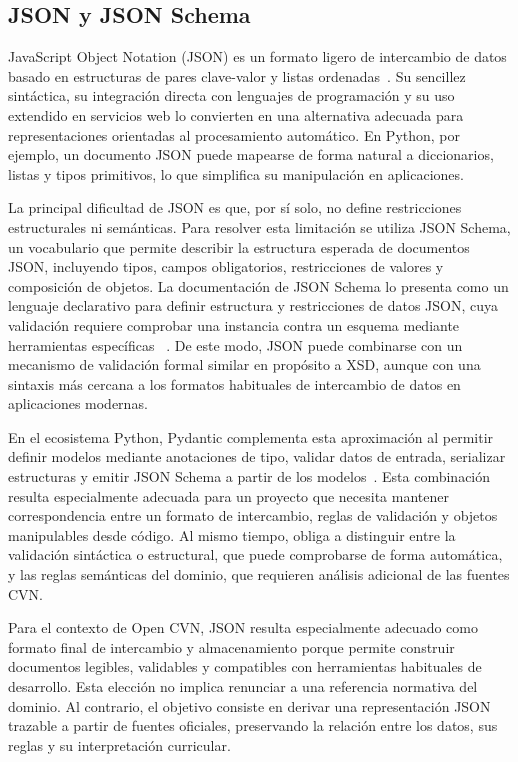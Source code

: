 \subsection{JSON y JSON Schema}
\label{subsec:estado_arte_json_schema}

JavaScript Object Notation (JSON) es un formato ligero de intercambio de datos
basado en estructuras de pares clave-valor y listas ordenadas~\cite{json_org_es}.
Su sencillez sintáctica, su integración directa con lenguajes de programación y
su uso extendido en servicios web lo convierten en una alternativa adecuada para
representaciones orientadas al procesamiento automático. En Python, por ejemplo,
un documento JSON puede mapearse de forma natural a diccionarios, listas y tipos
primitivos, lo que simplifica su manipulación en aplicaciones.

La principal dificultad de JSON es que, por sí solo, no define restricciones
estructurales ni semánticas. Para resolver esta limitación se utiliza JSON Schema,
un vocabulario que permite describir la estructura esperada de documentos JSON,
incluyendo tipos, campos obligatorios, restricciones de valores y composición de
objetos. La documentación de JSON Schema lo presenta como un lenguaje declarativo
para definir estructura y restricciones de datos JSON, cuya validación requiere
comprobar una instancia contra un esquema mediante herramientas específicas
~\cite{json_schema_overview}. De este modo, JSON puede combinarse con un mecanismo
de validación formal similar en propósito a XSD, aunque con una sintaxis más
cercana a los formatos habituales de intercambio de datos en aplicaciones
modernas.

En el ecosistema Python, Pydantic complementa esta aproximación al permitir definir
modelos mediante anotaciones de tipo, validar datos de entrada, serializar
estructuras y emitir JSON Schema a partir de los modelos~\cite{pydantic_docs}.
Esta combinación resulta especialmente adecuada para un proyecto que necesita
mantener correspondencia entre un formato de intercambio, reglas de validación y
objetos manipulables desde código. Al mismo tiempo, obliga a distinguir entre la
validación sintáctica o estructural, que puede comprobarse de forma automática, y
las reglas semánticas del dominio, que requieren análisis adicional de las fuentes
CVN.

Para el contexto de Open CVN, JSON resulta especialmente adecuado como formato
final de intercambio y almacenamiento porque permite construir documentos
legibles, validables y compatibles con herramientas habituales de desarrollo.
Esta elección no implica renunciar a una referencia normativa del dominio. Al
contrario, el objetivo consiste en derivar una representación JSON trazable a
partir de fuentes oficiales, preservando la relación entre los datos, sus reglas y
su interpretación curricular.

